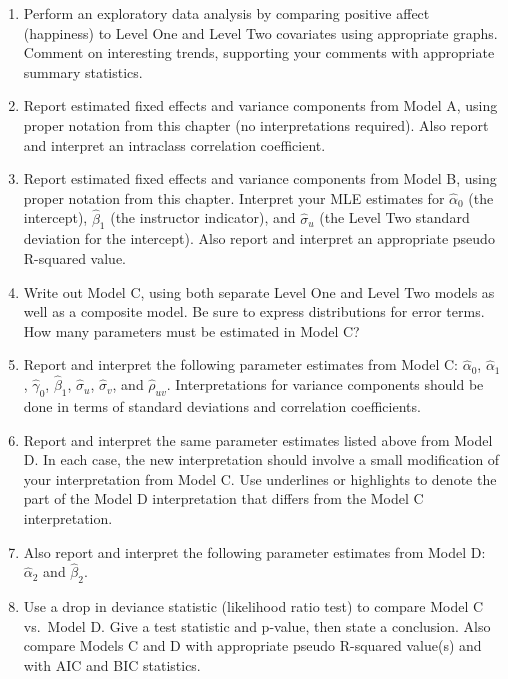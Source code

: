 \documentclass[
]{krantz}
\begin{document}
\begin{enumerate}
  \begin{enumerate}
  \def\labelenumii{\alph{enumii}.}
  \item
    Perform an exploratory data analysis by comparing positive affect (happiness) to Level One and Level Two covariates using appropriate graphs. Comment on interesting trends, supporting your comments with appropriate summary statistics.
  \item
    Report estimated fixed effects and variance components from Model A, using proper notation from this chapter (no interpretations required). Also report and interpret an intraclass correlation coefficient.
  \item
    Report estimated fixed effects and variance components from Model B, using proper notation from this chapter. Interpret your MLE estimates for \(\hat{\alpha}_{0}\) (the intercept), \(\hat{\beta}_{1}\) (the instructor indicator), and \(\hat{\sigma}_{u}\) (the Level Two standard deviation for the intercept). Also report and interpret an appropriate pseudo R-squared value.
  \item
    Write out Model C, using both separate Level One and Level Two models as well as a composite model. Be sure to express distributions for error terms. How many parameters must be estimated in Model C?
  \item
    Report and interpret the following parameter estimates from Model C: \(\hat{\alpha}_{0}\), \(\hat{\alpha}_{1}\), \(\hat{\gamma}_{0}\), \(\hat{\beta}_{1}\), \(\hat{\sigma}_{u}\), \(\hat{\sigma}_{v}\), and \(\hat{\rho}_{uv}\). Interpretations for variance components should be done in terms of standard deviations and correlation coefficients.
  \item
    Report and interpret the same parameter estimates listed above from Model D. In each case, the new interpretation should involve a small modification of your interpretation from Model C. Use underlines or highlights to denote the part of the Model D interpretation that differs from the Model C interpretation.
  \item
    Also report and interpret the following parameter estimates from Model D: \(\hat{\alpha}_{2}\) and \(\hat{\beta}_{2}\).
  \item
    Use a drop in deviance statistic (likelihood ratio test) to compare Model C vs.~Model D. Give a test statistic and p-value, then state a conclusion. Also compare Models C and D with appropriate pseudo R-squared value(s) and with AIC and BIC statistics.
  \end{enumerate}
\end{enumerate}
\end{document}
